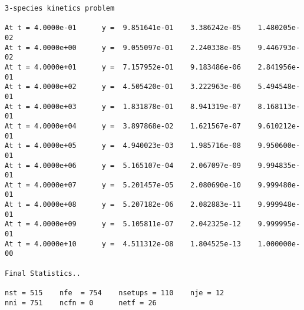\begin{verbatim} 
3-species kinetics problem

At t = 4.0000e-01      y =  9.851641e-01    3.386242e-05    1.480205e-02
At t = 4.0000e+00      y =  9.055097e-01    2.240338e-05    9.446793e-02
At t = 4.0000e+01      y =  7.157952e-01    9.183486e-06    2.841956e-01
At t = 4.0000e+02      y =  4.505420e-01    3.222963e-06    5.494548e-01
At t = 4.0000e+03      y =  1.831878e-01    8.941319e-07    8.168113e-01
At t = 4.0000e+04      y =  3.897868e-02    1.621567e-07    9.610212e-01
At t = 4.0000e+05      y =  4.940023e-03    1.985716e-08    9.950600e-01
At t = 4.0000e+06      y =  5.165107e-04    2.067097e-09    9.994835e-01
At t = 4.0000e+07      y =  5.201457e-05    2.080690e-10    9.999480e-01
At t = 4.0000e+08      y =  5.207182e-06    2.082883e-11    9.999948e-01
At t = 4.0000e+09      y =  5.105811e-07    2.042325e-12    9.999995e-01
At t = 4.0000e+10      y =  4.511312e-08    1.804525e-13    1.000000e-00

Final Statistics.. 

nst = 515    nfe  = 754    nsetups = 110    nje = 12
nni = 751    ncfn = 0      netf = 26
\end{verbatim}